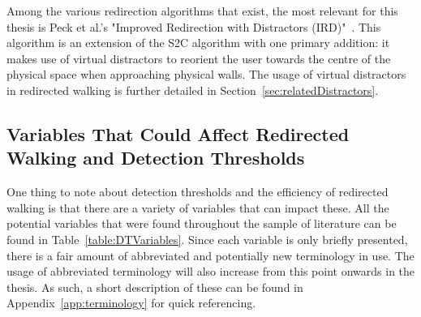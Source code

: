 Among the various redirection algorithms that exist, the most relevant for this thesis is Peck et al.'s "Improved Redirection with Distractors (IRD)"~\cite{peck2010improved}. This algorithm is an extension of the S2C algorithm with one primary addition: it makes use of virtual distractors to reorient the user towards the centre of the physical space when approaching physical walls. The usage of virtual distractors in redirected walking is further detailed in Section~\ref{sec:relatedDistractors}.

\subsection{Variables That Could Affect Redirected Walking and Detection Thresholds}
One thing to note about detection thresholds and the efficiency of redirected walking is that there are a variety of variables that can impact these. All the potential variables that were found throughout the sample of literature can be found in Table~\ref{table:DTVariables}. Since each variable is only briefly presented, there is a fair amount of abbreviated and potentially new terminology in use. The usage of abbreviated terminology will also increase from this point onwards in the thesis. As such, a short description of these can be found in Appendix~\ref{app:terminology} for quick referencing.


